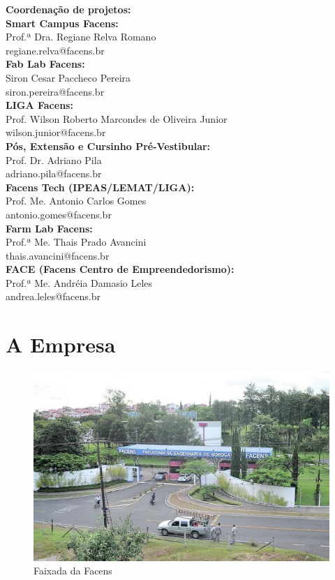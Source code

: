 \documentclass[
	12pt,				%
	oneside,			%
	a4paper,			%
	chapter=TITLE,		%
	section=TITLE,		%
	sumario=tradicional %
	english,			%
	french,				%
	spanish,			%
	brazil				%
	]{abntex2}
\begin{document}
\textbf{Coordenação de projetos:}  \\

\textbf{Smart Campus Facens:} \\ \indent Prof.ª Dra. Regiane Relva Romano \\
\indent regiane.relva@facens.br \\

\textbf{Fab Lab Facens:} \\ \indent Siron Cesar Paccheco Pereira \\
\indent siron.pereira@facens.br \\

\textbf{LIGA Facens:} \\ \indent Prof. Wilson Roberto Marcondes de Oliveira Junior \\
\indent wilson.junior@facens.br \\

\textbf{Pós, Extensão e Cursinho Pré-Vestibular:} \\ \indent Prof. Dr. Adriano Pila \\
\indent adriano.pila@facens.br \\

\textbf{Facens Tech (IPEAS/LEMAT/LIGA):} \\ \indent Prof. Me. Antonio Carlos Gomes \\
\indent antonio.gomes@facens.br \\

\textbf{Farm Lab Facens:} \\ \indent Prof.ª Me. Thais Prado Avancini \\
\indent thais.avancini@facens.br \\

\textbf{FACE (Facens Centro de Empreendedorismo):} \\ \indent Prof.ª Me. Andréia Damasio Leles \\
\indent andrea.leles@facens.br

\section{A Empresa}
\label{sec:aempresa}
\begin{figure}[htb]
	\caption{\label{fig:mapsfacens} Faixada da Facens}
	\begin{center}
		\includegraphics[scale=0.85]{facensfachada}
	\end{center}
\end{figure}
\end{document}
